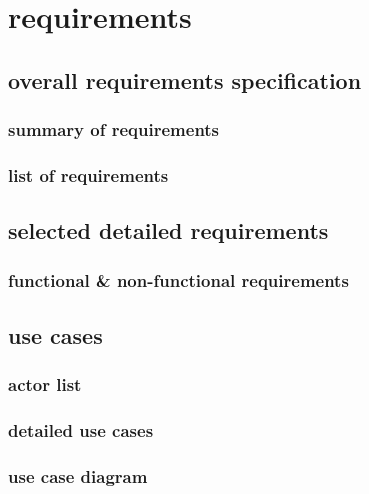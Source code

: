 \section{requirements}
\subsection{overall requirements specification}
\subsubsection{summary of requirements}
\subsubsection{list of requirements}
\subsection{selected detailed requirements}
\subsubsection{functional \& non-functional requirements}
\subsection{use cases}
\subsubsection{actor list}
\subsubsection{detailed use cases}
\subsubsection{use case diagram}
